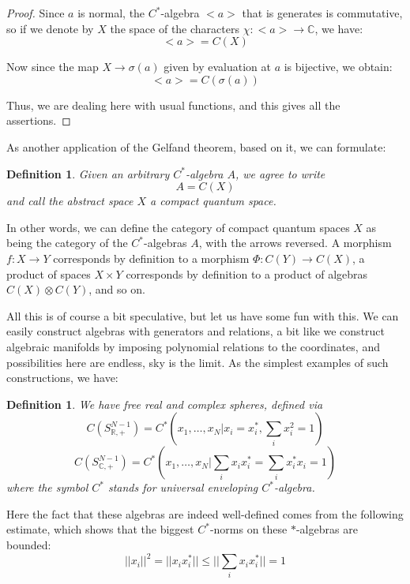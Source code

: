 \documentclass[12pt]{amsbook}
\newtheorem{definition}[theorem]{Definition}
\begin{document}
\begin{proof}
Since $a$ is normal, the $C^*$-algebra $<a>$ that is generates is commutative, so if we denote by $X$ the space of the characters $\chi:<a>\to\mathbb C$, we have:
$$<a>=C(X)$$

Now since the map $X\to\sigma(a)$ given by evaluation at $a$ is bijective, we obtain:
$$<a>=C(\sigma(a))$$

Thus, we are dealing here with usual functions, and this gives all the assertions.
\end{proof}

As another application of the Gelfand theorem, based on it, we can formulate:


\begin{definition}
Given an arbitrary $C^*$-algebra $A$, we agree to write 
$$A=C(X)$$
and call the abstract space $X$ a compact quantum space.
\end{definition}

In other words, we can define the category of compact quantum spaces $X$ as being the category of the $C^*$-algebras $A$, with the arrows reversed. A morphism $f:X\to Y$ corresponds by definition to a morphism $\Phi:C(Y)\to C(X)$, a product of spaces $X\times Y$ corresponds by definition to a product of algebras $C(X)\otimes C(Y)$, and so on.

\bigskip

All this is of course a bit speculative, but let us have some fun with this. We can easily construct algebras with generators and relations, a bit like we construct algebraic manifolds by imposing polynomial relations to the coordinates, and possibilities here are endless, sky is the limit. As the simplest examples of such constructions, we have:


\begin{definition}
We have free real and complex spheres, defined via
$$C(S^{N-1}_{\mathbb R,+})=C^*\left(x_1,\ldots,x_N\Big|x_i=x_i^*,\sum_ix_i^2=1\right)$$
$$C(S^{N-1}_{\mathbb C,+})=C^*\left(x_1,\ldots,x_N\Big|\sum_ix_ix_i^*=\sum_ix_i^*x_i=1\right)$$
where the symbol $C^*$ stands for universal enveloping $C^*$-algebra.
\end{definition}

Here the fact that these algebras are indeed well-defined comes from the following estimate, which shows that the biggest $C^*$-norms on these $*$-algebras are bounded:
$$||x_i||^2
=||x_ix_i^*||
\leq\Big|\Big|\sum_ix_ix_i^*\Big|\Big|
=1$$
\end{document}
